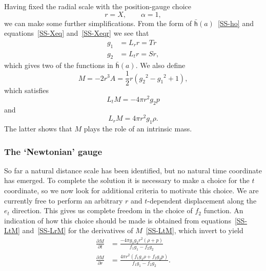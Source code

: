 \documentclass[a4paper]{article}
\numberwithin{equation}{section}
\newcommand{\half}{{\textstyle \frac{1}{2}}}
\newcommand{\eqv}{=}
\newcommand{\alp}{\alpha}
\newcommand{\lbh}{\bar{\mathsf{h}}}
\newcommand{\ho}{\lbh}
\newcommand{\deriv}[2]{\frac{\partial #1}{\partial #2}}
\begin{document}
Having fixed the radial scale with the position-gauge choice
%
\begin{equation}
r = X, \qquad \alp= 1,
\label{SS-Xeqr}
\end{equation}
%
we can make some further simplifications.  From the form of
$\ho(a)$~\eqref{SS-ho} and equations~\eqref{SS-Xeq} and~\eqref{SS-Xeqr} we see
that
%
\begin{align}
g_1 &= L_r r = Tr \label{SS-int5} \\
g_2 &= L_t r = Sr,
\end{align}
%
which gives two of the functions in $\ho(a)$.  We also define
%
\begin{equation}
M \eqv -2 r^3 A = \half r ({g_2}^2 - {g_1}^2 +1),
\label{SS-defM}
\end{equation}
%
which satisfies
%
\begin{equation}
L_t M = -4\pi r^2 g_2 p
\label{SS-LtM}
\end{equation}
%
and
%
\begin{equation}
L_r M = 4\pi r^2 g_1 \rho.
\label{SS-LrM}
\end{equation}
%
The latter shows that $M$ plays the role of an intrinsic mass.



\subsubsection*{The `Newtonian' gauge}

So far a natural distance scale has been identified, but no natural
time coordinate has emerged.  To complete the solution it is
necessary to make a choice for the $t$ coordinate, so we now look for
additional criteria to motivate this choice.  We are currently free to
perform an arbitrary $r$ and $t$-dependent displacement along the
$e_t$ direction.  This gives us complete freedom in the
choice of $f_2$ function.  An indication of how this choice should be
made is obtained from equations~\eqref{SS-LtM} and~\eqref{SS-LrM} for the
derivatives of $M$~\eqref{SS-LtM}, which invert to yield
%
\begin{align}
\deriv{M}{t} &= \frac{-4 \pi g_1 g_2 r^2(\rho + p)}{f_1 g_1 - f_2
g_2} \label{SS-class1} \\ 
\deriv{M}{r} &= \frac{4 \pi r^2 (f_1 g_1 \rho + f_2 g_2 p)}{f_1 g_1 - f_2
g_2}. 
\end{align}
%
\end{document}
